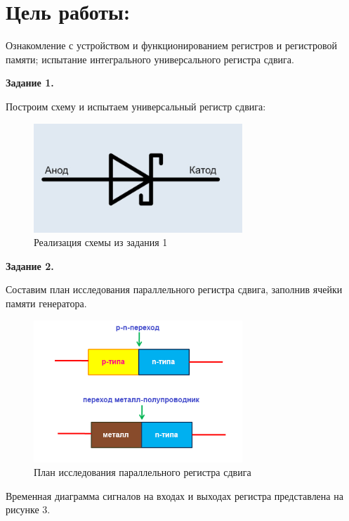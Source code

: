 \documentclass[spec, och, labwork]{shiza}
\begin{document}
\section{Цель работы:}

  Ознакомление с устройством и функционированием регистров и регистровой памяти; испытание интегрального универсального регистра сдвига.

  \textbf{Задание 1.}

  Построим схему и испытаем универсальный регистр сдвига:

  \begin{figure}[H]
    \centering     
    \includegraphics[width=0.7\textwidth]{photo/1}
    \caption{Реализация схемы из задания 1}
  \end{figure}

  \textbf{Задание 2.}

  Составим план исследования параллельного регистра сдвига, заполнив ячейки памяти генератора.

  \begin{figure}[H]
    \centering     
    \includegraphics[width=0.7\textwidth]{photo/2}
    \caption{План исследования параллельного регистра сдвига}
  \end{figure}

  Временная диаграмма сигналов на входах и выходах регистра представлена на рисунке 3.
\end{document}
